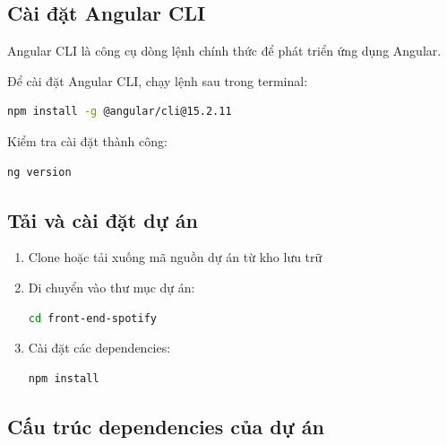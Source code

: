 
\subsection{Cài đặt Angular CLI}

Angular CLI là công cụ dòng lệnh chính thức để phát triển ứng dụng Angular.


Để cài đặt Angular CLI, chạy lệnh sau trong terminal:

\begin{lstlisting}[language=bash]
npm install -g @angular/cli@15.2.11
\end{lstlisting}

Kiểm tra cài đặt thành công:

\begin{lstlisting}[language=bash]
ng version
\end{lstlisting}

\subsection{Tải và cài đặt dự án}

\begin{enumerate}
  \item Clone hoặc tải xuống mã nguồn dự án từ kho lưu trữ
  \item Di chuyển vào thư mục dự án:
  \begin{lstlisting}[language=bash]
  cd front-end-spotify
  \end{lstlisting}
  \item Cài đặt các dependencies:
  \begin{lstlisting}[language=bash]
  npm install
  \end{lstlisting}
\end{enumerate}

\subsection{Cấu trúc dependencies của dự án}


